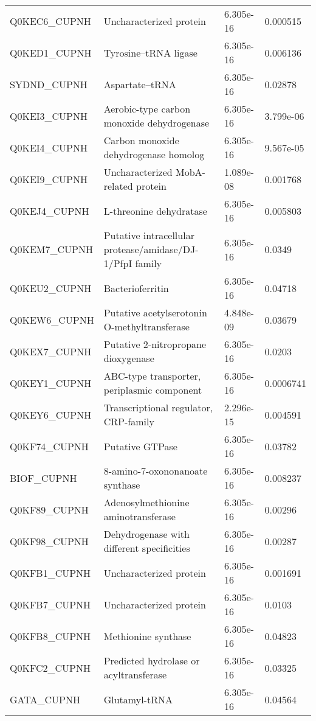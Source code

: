 \begin{center}
\begin{longtable}{ l l l l }
Q0KEC6\_CUPNH & Uncharacterized protein& 6.305e-16 & 0.000515 \\ [0.5ex]
Q0KED1\_CUPNH & Tyrosine--tRNA ligase& 6.305e-16 & 0.006136 \\ [0.5ex]
SYDND\_CUPNH & Aspartate--tRNA & 6.305e-16 & 0.02878 \\ [0.5ex]
Q0KEI3\_CUPNH & Aerobic-type carbon monoxide dehydrogenase & 6.305e-16 & 3.799e-06 \\ [0.5ex]
Q0KEI4\_CUPNH & Carbon monoxide dehydrogenase homolog & 6.305e-16 & 9.567e-05 \\ [0.5ex]
Q0KEI9\_CUPNH & Uncharacterized MobA-related protein& 1.089e-08 & 0.001768 \\ [0.5ex]
Q0KEJ4\_CUPNH & L-threonine dehydratase& 6.305e-16 & 0.005803 \\ [0.5ex]
Q0KEM7\_CUPNH & Putative intracellular protease/amidase/DJ-1/PfpI family& 6.305e-16 & 0.0349 \\ [0.5ex]
Q0KEU2\_CUPNH & Bacterioferritin& 6.305e-16 & 0.04718 \\ [0.5ex]
Q0KEW6\_CUPNH & Putative acetylserotonin O-methyltransferase& 4.848e-09 & 0.03679 \\ [0.5ex]
Q0KEX7\_CUPNH & Putative 2-nitropropane dioxygenase& 6.305e-16 & 0.0203 \\ [0.5ex]
Q0KEY1\_CUPNH & ABC-type transporter, periplasmic component& 6.305e-16 & 0.0006741 \\ [0.5ex]
Q0KEY6\_CUPNH & Transcriptional regulator, CRP-family& 2.296e-15 & 0.004591 \\ [0.5ex]
Q0KF74\_CUPNH & Putative GTPase& 6.305e-16 & 0.03782 \\ [0.5ex]
BIOF\_CUPNH & 8-amino-7-oxononanoate synthase& 6.305e-16 & 0.008237 \\ [0.5ex]
Q0KF89\_CUPNH & Adenosylmethionine aminotransferase& 6.305e-16 & 0.00296 \\ [0.5ex]
Q0KF98\_CUPNH & Dehydrogenase with different specificities& 6.305e-16 & 0.00287 \\ [0.5ex]
Q0KFB1\_CUPNH & Uncharacterized protein& 6.305e-16 & 0.001691 \\ [0.5ex]
Q0KFB7\_CUPNH & Uncharacterized protein& 6.305e-16 & 0.0103 \\ [0.5ex]
Q0KFB8\_CUPNH & Methionine synthase& 6.305e-16 & 0.04823 \\ [0.5ex]
Q0KFC2\_CUPNH & Predicted hydrolase or acyltransferase& 6.305e-16 & 0.03325 \\ [0.5ex]
GATA\_CUPNH & Glutamyl-tRNA & 6.305e-16 & 0.04564 \\ [0.5ex]

\end{longtable}
\end{center}
